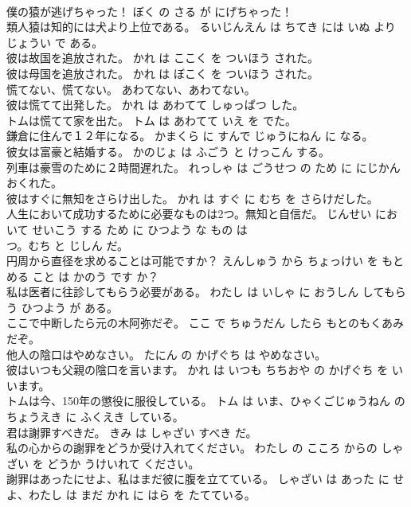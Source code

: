 \documentclass[8pt]{extreport}
\begin{document}
\begin{CJK}{UTF8}{min}
\\	僕の猿が逃げちゃった！	ぼく の さる が にげちゃった！	
\\	類人猿は知的には犬より上位である。	るいじんえん は ちてき には いぬ より じょうい で ある。	
\\	彼は故国を追放された。	かれ は ここく を ついほう された。	
\\	彼は母国を追放された。	かれ は ぼこく を ついほう された。	
\\	慌てない、慌てない。	あわてない、あわてない。	
\\	彼は慌てて出発した。	かれ は あわてて しゅっぱつ した。	
\\	トムは慌てて家を出た。	トム は あわてて いえ を でた。	
\\	鎌倉に住んで１２年になる。	かまくら に すんで じゅうにねん に なる。	
\\	彼女は富豪と結婚する。	かのじょ は ふごう と けっこん する。	
\\	列車は豪雪のために２時間遅れた。	れっしゃ は ごうせつ の ため に にじかん おくれた。	
\\	彼はすぐに無知をさらけ出した。	かれ は すぐ に むち を さらけだした。	
\\	人生において成功するために必要なものは2つ。無知と自信だ。	じんせい において せいこう する ため に ひつよう な もの は 
\\	つ。むち と じしん だ。	
\\	円周から直径を求めることは可能ですか？	えんしゅう から ちょっけい を もとめる こと は かのう です か？	
\\	私は医者に往診してもらう必要がある。	わたし は いしゃ に おうしん してもらう ひつよう が ある。	
\\	ここで中断したら元の木阿弥だぞ。	ここ で ちゅうだん したら もとのもくあみ だぞ。	
\\	他人の陰口はやめなさい。	たにん の かげぐち は やめなさい。	
\\	彼はいつも父親の陰口を言います。	かれ は いつも ちちおや の かげぐち を いいます。	
\\	トムは今、150年の懲役に服役している。	トム は いま、ひゃくごじゅうねん の ちょうえき に ふくえき している。	
\\	君は謝罪すべきだ。	きみ は しゃざい すべき だ。	
\\	私の心からの謝罪をどうか受け入れてください。	わたし の こころ からの しゃざい を どうか うけいれて ください。	
\\	謝罪はあったにせよ、私はまだ彼に腹を立てている。	しゃざい は あった に せよ、わたし は まだ かれ に はら を たてている。	

\end{CJK}
\end{document}
